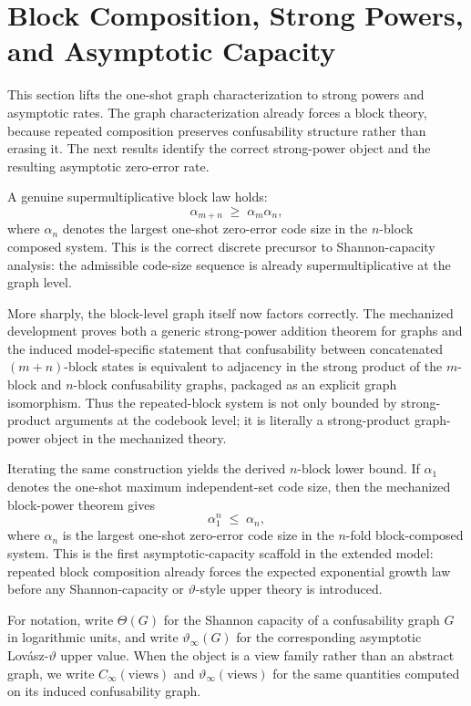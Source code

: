 \section{Block Composition, Strong Powers, and Asymptotic Capacity}\label{sec:capacity-theory}


This section lifts the one-shot graph characterization to strong powers and asymptotic rates. The graph characterization already forces a block theory, because repeated composition preserves confusability structure rather than erasing it. The next results identify the correct strong-power object and the resulting asymptotic zero-error rate.

A genuine supermultiplicative block law holds:
\[
\alpha_{m+n}\;\ge\;\alpha_m\alpha_n,
\]
where $\alpha_n$ denotes the largest one-shot zero-error code size in the $n$-block composed system. This is the correct discrete precursor to Shannon-capacity analysis: the admissible code-size sequence is already supermultiplicative at the graph level.

More sharply, the block-level graph itself now factors correctly. The mechanized development proves both a generic strong-power addition theorem for graphs and the induced model-specific statement that confusability between concatenated $(m+n)$-block states is equivalent to adjacency in the strong product of the $m$-block and $n$-block confusability graphs, packaged as an explicit graph isomorphism. Thus the repeated-block system is not only bounded by strong-product arguments at the codebook level; it is literally a strong-product graph-power object in the mechanized theory.

Iterating the same construction yields the derived $n$-block lower bound. If $\alpha_1$ denotes the one-shot maximum independent-set code size, then the mechanized block-power theorem gives
\[
\alpha_1^n \;\le\; \alpha_n,
\]
where $\alpha_n$ is the largest one-shot zero-error code size in the $n$-fold block-composed system. This is the first asymptotic-capacity scaffold in the extended model: repeated block composition already forces the expected exponential growth law before any Shannon-capacity or $\vartheta$-style upper theory is introduced.

For notation, write $\Theta(G)$ for the Shannon capacity of a confusability graph $G$ in logarithmic units, and write $\vartheta_\infty(G)$ for the corresponding asymptotic Lov\'asz-$\vartheta$ upper value. When the object is a view family rather than an abstract graph, we write $C_\infty(\text{views})$ and $\vartheta_\infty(\text{views})$ for the same quantities computed on its induced confusability graph.

